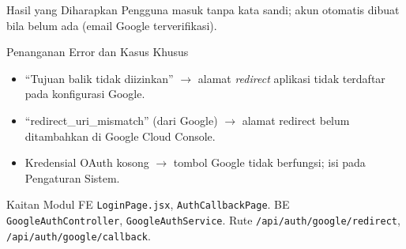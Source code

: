
\begin{flowsection}{Hasil yang Diharapkan}
Pengguna masuk tanpa kata sandi; akun otomatis dibuat bila belum ada (email Google
terverifikasi).
\end{flowsection}

\begin{flowsection}{Penanganan Error dan Kasus Khusus}
\begin{itemize}
  \item ``Tujuan balik tidak diizinkan'' $\rightarrow$ alamat \emph{redirect}
        aplikasi tidak terdaftar pada konfigurasi Google.
  \item ``redirect\_uri\_mismatch'' (dari Google) $\rightarrow$ alamat redirect
        belum ditambahkan di Google Cloud Console.
  \item Kredensial OAuth kosong $\rightarrow$ tombol Google tidak berfungsi;
        isi pada Pengaturan Sistem.
\end{itemize}
\end{flowsection}

\begin{flowsection}{Kaitan Modul}
FE \texttt{LoginPage.jsx}, \texttt{AuthCallbackPage}. BE
\texttt{GoogleAuthController}, \texttt{GoogleAuthService}. Rute
\texttt{/api/auth/google/redirect}, \texttt{/api/auth/google/callback}.
\end{flowsection}


